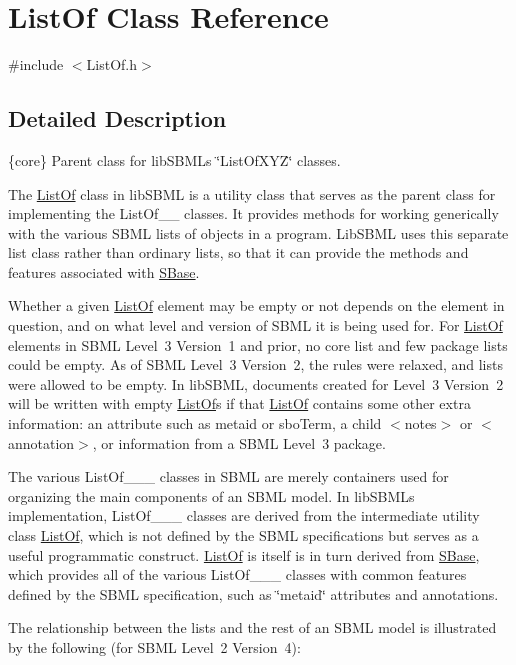 \hypertarget{class_list_of}{}\section{List\+Of Class Reference}
\label{class_list_of}


{\ttfamily \#include $<$List\+Of.\+h$>$}



\subsection{Detailed Description}
\{core\} Parent class for lib\+S\+B\+ML\textquotesingle{}s \char`\"{}\+List\+Of\+X\+Y\+Z\char`\"{} classes.



The \hyperlink{class_list_of}{List\+Of} class in lib\+S\+B\+ML is a utility class that serves as the parent class for implementing the List\+Of\+\_\+\+\_\+ classes. It provides methods for working generically with the various S\+B\+ML lists of objects in a program. Lib\+S\+B\+ML uses this separate list class rather than ordinary lists, so that it can provide the methods and features associated with \hyperlink{class_s_base}{S\+Base}.

Whether a given \hyperlink{class_list_of}{List\+Of} element may be empty or not depends on the element in question, and on what level and version of S\+B\+ML it is being used for. For \hyperlink{class_list_of}{List\+Of} elements in S\+B\+ML Level~3 Version~1 and prior, no core list and few package lists could be empty. As of S\+B\+ML Level~3 Version~2, the rules were relaxed, and lists were allowed to be empty. In lib\+S\+B\+ML, documents created for Level~3 Version~2 will be written with empty \hyperlink{class_list_of}{List\+Of}\textquotesingle{}s if that \hyperlink{class_list_of}{List\+Of} contains some other \textquotesingle{}extra\textquotesingle{} information\+: an attribute such as metaid or sbo\+Term, a child \textquotesingle{}$<$notes$>$\textquotesingle{} or \textquotesingle{}$<$annotation$>$\textquotesingle{}, or information from a S\+B\+ML Level~3 package.

\begin{DoxyParagraph}{}
The various List\+Of\+\_\+\+\_\+\+\_\+ classes in S\+B\+ML are merely containers used for organizing the main components of an S\+B\+ML model. In lib\+S\+B\+ML\textquotesingle{}s implementation, List\+Of\+\_\+\+\_\+\+\_\+ classes are derived from the intermediate utility class \hyperlink{class_list_of}{List\+Of}, which is not defined by the S\+B\+ML specifications but serves as a useful programmatic construct. \hyperlink{class_list_of}{List\+Of} is itself is in turn derived from \hyperlink{class_s_base}{S\+Base}, which provides all of the various List\+Of\+\_\+\+\_\+\+\_\+ classes with common features defined by the S\+B\+ML specification, such as \char`\"{}metaid\char`\"{} attributes and annotations.
\end{DoxyParagraph}
The relationship between the lists and the rest of an S\+B\+ML model is illustrated by the following (for S\+B\+ML Level~2 Version~4)\+:



